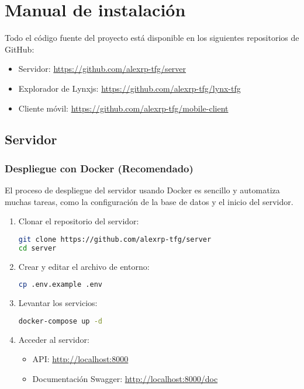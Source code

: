 \chapter{Manual de instalación}
\label{chap:manual_instalacion}
Todo el código fuente del proyecto está disponible en los siguientes repositorios de GitHub:
\begin{itemize}
    \item Servidor: \url{https://github.com/alexrp-tfg/server}
    \item Explorador de Lynxjs: \url{https://github.com/alexrp-tfg/lynx-tfg}
    \item Cliente móvil: \url{https://github.com/alexrp-tfg/mobile-client}
\end{itemize}
\section{Servidor}
\subsection{Despliegue con Docker (Recomendado)}
El proceso de despliegue del servidor usando Docker es sencillo y automatiza muchas tareas, como la configuración de la base de datos y el inicio del servidor.
\begin{enumerate}
    \item Clonar el repositorio del servidor:
\begin{lstlisting}[language=bash]
git clone https://github.com/alexrp-tfg/server
cd server
\end{lstlisting}

    \item Crear y editar el archivo de entorno:
\begin{lstlisting}[language=bash]
cp .env.example .env
\end{lstlisting}

    \item Levantar los servicios:
\begin{lstlisting}[language=bash]
docker-compose up -d
\end{lstlisting}

    \item Acceder al servidor:
        \begin{itemize}
            \item API: \url{http://localhost:8000}
            \item Documentación Swagger: \url{http://localhost:8000/doc}
        \end{itemize}
\end{enumerate}

